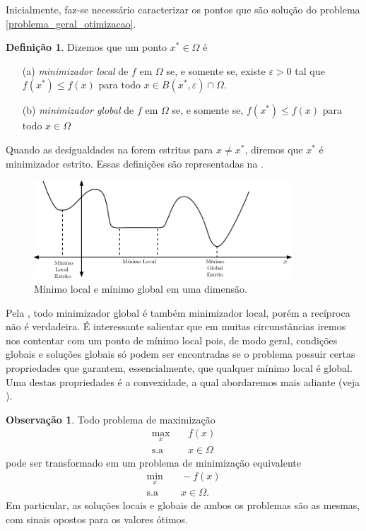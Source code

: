 \documentclass[12pt,a4paper]{scrartcl}
\theoremstyle{definition}%
\newtheorem{defi}{Definição}
\newtheorem{obs}{Observação}
\begin{document}
Inicialmente, faz-se necessário caracterizar os pontos que são solução do problema \eqref{problema_geral_otimizacao}.

\begin{defi} \label{defi:minimizador_local_global}
Dizemos que um ponto $x^{*} \in \Omega$ é
\begin{enumerate}
	\item[(a)] \emph{minimizador local} de $f$ em $\Omega$ se, e somente se, existe $\varepsilon >0$ tal que $f(x^{*}) \leq f(x)$ para todo $x \in B(x^{*}, \varepsilon) \cap \Omega$.

	\item[(b)] \emph{minimizador global} de $f$ em $\Omega$ se, e somente se, $f(x^{*}) \leq f(x)$ para todo $x \in \Omega$
\end{enumerate} 
\end{defi}

Quando as desigualdades na  forem estritas para $x \neq x^{*}$, diremos que $x^{*}$ é minimizador estrito. Essas definições são representadas na .

\begin{figure}[!ht] 
	\centering
	\includegraphics[width=0.86\textwidth]{grafico_minimo_local_global}
	\caption{ Mínimo local e mínimo global em uma dimensão. \label{fig:grafico_minimo_local_global}}
\end{figure}

Pela , todo minimizador global é também minimizador local, porém a recíproca não é verdadeira. É interessante salientar que em muitas circunstâncias iremos nos contentar com um ponto de mínimo local pois, de modo geral, condições globais e soluções globais só podem ser encontradas se o problema possuir certas propriedades que garantem, essencialmente, que qualquer mínimo local é global. Uma destas propriedades é a convexidade, a qual abordaremos mais adiante (veja ).

\begin{obs}
Todo problema de maximização
\[
\begin{aligned}
\max_{x} & \quad f(x) \\
\text{s.a} & \quad x \in \Omega \end{aligned}
 \]
pode ser transformado em um problema de minimização equivalente
\[
\begin{aligned}
\min_{x} & \quad -f(x) \\
\text{s.a} & \quad x \in \Omega .\end{aligned}
\]
Em particular, as soluções locais e globais de ambos os problemas são as mesmas, com sinais opostos para os valores ótimos.
\end{obs} %
\end{document}

